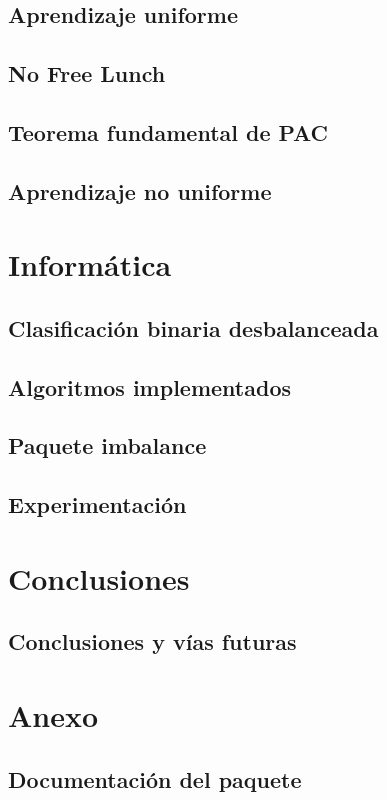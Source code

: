 \documentclass[oneside,openany,titlepage,dottedtoc,headinclude,%
               footinclude=true,cleardoublepage=empty,abstractoff, %
               paper=a4,fontsize=11pt,%
               ]{scrreprt}
\begin{document}
  \chapter{Aprendizaje uniforme}
    
  \chapter{No Free Lunch}
    
  \chapter{Teorema fundamental de PAC}
    
  \chapter{Aprendizaje no uniforme}
    
  
\part{Informática}
  \chapter{Clasificación binaria desbalanceada}
    
  \chapter{Algoritmos implementados}
    
    
    
    
    
  \chapter{Paquete imbalance}
    
  \chapter{Experimentación}
    

\part{Conclusiones}
\chapter{Conclusiones y vías futuras}
 
\appendix
\part*{Anexo}
  \chapter{Documentación del paquete}
    


\end{document}
